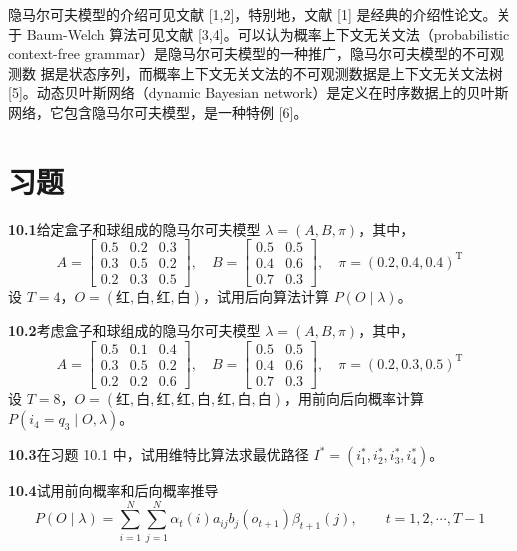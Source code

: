 \documentclass[UTF8, 12pt, fontset=fandol, oneside]{ctexart}
\begin{document}
隐马尔可夫模型的介绍可见文献 [1,2]，特别地，文献 [1] 是经典的介绍性论文。关于 Baum-Welch 算法可见文献 [3,4]。可以认为概率上下文无关文法（probabilistic context-free grammar）是隐马尔可夫模型的一种推广，隐马尔可夫模型的不可观测数
据是状态序列，而概率上下文无关文法的不可观测数据是上下文无关文法树 [5]。动态贝叶斯网络（dynamic Bayesian network）是定义在时序数据上的贝叶斯网络，它包含隐马尔可夫模型，是一种特例 [6]。

\section*{习题}

\noindent\textbf{10.1}\quad 给定盒子和球组成的隐马尔可夫模型 $\lambda=(A,B,\pi)$，其中，
\[
  A=
  \begin{bmatrix}
    0.5 & 0.2 & 0.3\\
    0.3 & 0.5 & 0.2\\
    0.2 & 0.3 & 0.5
  \end{bmatrix},
  \quad
  B=
  \begin{bmatrix}
    0.5 & 0.5\\
    0.4 & 0.6\\
    0.7 & 0.3
  \end{bmatrix},
  \quad
  \pi=(0.2,0.4,0.4)^{\mathrm T}
\]
设 $T=4$，$O=(\text{红},\text{白},\text{红},\text{白})$，试用后向算法计算 $P(O\mid\lambda)$。

\noindent\textbf{10.2}\quad 考虑盒子和球组成的隐马尔可夫模型 $\lambda=(A,B,\pi)$，其中，
\[
  A=
  \begin{bmatrix}
    0.5 & 0.1 & 0.4\\
    0.3 & 0.5 & 0.2\\
    0.2 & 0.2 & 0.6
  \end{bmatrix},
  \quad
  B=
  \begin{bmatrix}
    0.5 & 0.5\\
    0.4 & 0.6\\
    0.7 & 0.3
  \end{bmatrix},
  \quad
  \pi=(0.2,0.3,0.5)^{\mathrm T}
\]
设 $T=8$，$O=(\text{红},\text{白},\text{红},\text{红},\text{白},\text{红},\text{白},\text{白})$，用前向后向概率计算 $P(i_4=q_3\mid O,\lambda)$。

\noindent\textbf{10.3}\quad 在习题 10.1 中，试用维特比算法求最优路径 $I^*=(i_1^*,i_2^*,i_3^*,i_4^*)$。

\noindent\textbf{10.4}\quad 试用前向概率和后向概率推导
\[
  P(O\mid\lambda)=\sum_{i=1}^N\sum_{j=1}^N\alpha_t(i)a_{ij}b_j(o_{t+1})\beta_{t+1}(j),
  \qquad t=1,2,\cdots,T-1
\]
\end{document}
